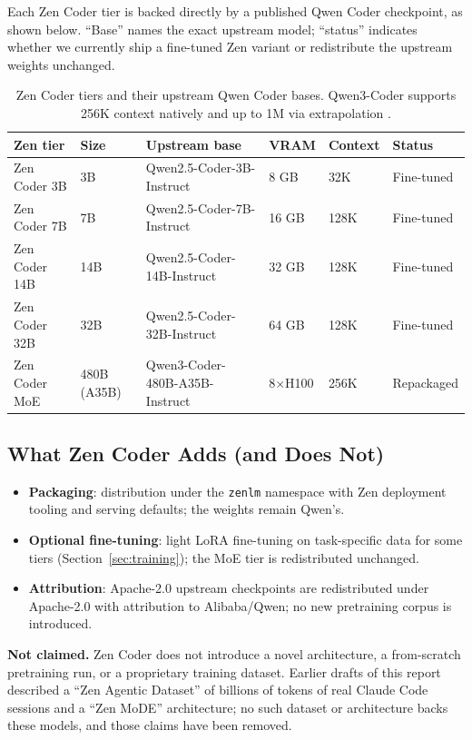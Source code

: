 \documentclass[11pt,a4paper]{article}
\begin{document}
Each Zen Coder tier is backed directly by a published Qwen Coder checkpoint, as shown below. ``Base''
names the exact upstream model; ``status'' indicates whether we currently ship a fine-tuned Zen
variant or redistribute the upstream weights unchanged.

\begin{table}[H]
\centering
\begin{tabular}{llllll}
\toprule
\textbf{Zen tier} & \textbf{Size} & \textbf{Upstream base} & \textbf{VRAM} & \textbf{Context} & \textbf{Status} \\
\midrule
Zen Coder 3B   & 3B          & Qwen2.5-Coder-3B-Instruct   & 8 GB   & 32K  & Fine-tuned \\
Zen Coder 7B   & 7B          & Qwen2.5-Coder-7B-Instruct   & 16 GB  & 128K & Fine-tuned \\
Zen Coder 14B  & 14B         & Qwen2.5-Coder-14B-Instruct  & 32 GB  & 128K & Fine-tuned \\
Zen Coder 32B  & 32B         & Qwen2.5-Coder-32B-Instruct  & 64 GB  & 128K & Fine-tuned \\
Zen Coder MoE  & 480B (A35B) & Qwen3-Coder-480B-A35B-Instruct & 8$\times$H100 & 256K & Repackaged \\
\bottomrule
\end{tabular}
\caption{Zen Coder tiers and their upstream Qwen Coder bases. Qwen3-Coder supports 256K context
natively and up to 1M via extrapolation \cite{qwen3coder}.}
\end{table}

\subsection{What Zen Coder Adds (and Does Not)}
\begin{itemize}
    \item \textbf{Packaging}: distribution under the \texttt{zenlm} namespace with Zen deployment
          tooling and serving defaults; the weights remain Qwen's.
    \item \textbf{Optional fine-tuning}: light LoRA fine-tuning on task-specific data for some tiers
          (Section~\ref{sec:training}); the MoE tier is redistributed unchanged.
    \item \textbf{Attribution}: Apache-2.0 upstream checkpoints are redistributed under Apache-2.0
          with attribution to Alibaba/Qwen; no new pretraining corpus is introduced.
\end{itemize}

\noindent\textbf{Not claimed.} Zen Coder does not introduce a novel architecture, a from-scratch
pretraining run, or a proprietary training dataset. Earlier drafts of this report described a ``Zen
Agentic Dataset'' of billions of tokens of real Claude Code sessions and a ``Zen MoDE'' architecture;
no such dataset or architecture backs these models, and those claims have been removed.
\end{document}
